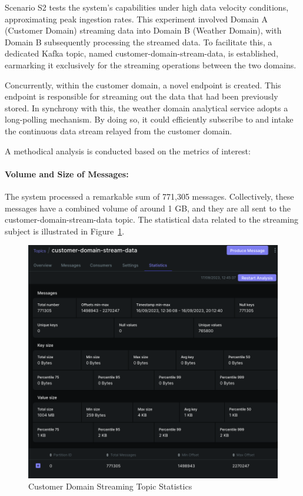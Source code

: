 \documentclass[preprint,12pt]{elsarticle}
\begin{document}
Scenario S2 tests the system's capabilities under high data velocity conditions, approximating peak ingestion rates. This experiment involved Domain A (Customer Domain) streaming data into Domain B (Weather Domain), with Domain B subsequently processing the streamed data. To facilitate this, a dedicated Kafka topic, named customer-domain-stream-data, is established, earmarking it exclusively for the streaming operations between the two domains. 

Concurrently, within the customer domain, a novel endpoint is created. This endpoint is responsible for streaming out the data that had been previously stored. In synchrony with this, the weather domain analytical service adopts a long-polling mechanism. By doing so, it could efficiently subscribe to and intake the continuous data stream relayed from the customer domain.

A methodical analysis is conducted based on the metrics of interest:

\paragraph{Volume and Size of Messages:} The system processed a remarkable sum of 771,305 messages. Collectively, these messages have a combined volume of around 1 GB, and they are all sent to the customer-domain-stream-data topic. The statistical data related to the streaming subject is illustrated in Figure~\ref{customerDomainStreamingTopicStatistics}.


\begin{figure}[h]
  \centering
  \includegraphics[width=\textwidth]{images/customer-domain-stream-data-topic-statistics.png}
  \caption{Customer Domain Streaming Topic Statistics}
  \label{customerDomainStreamingTopicStatistics}
\end{figure}
\end{document}
